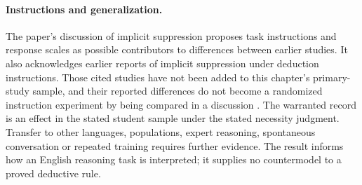 \paragraph{Instructions and generalization.}
The paper's discussion of implicit suppression proposes task instructions and
response scales as possible contributors to differences between earlier
studies. It also acknowledges earlier reports of implicit suppression under
deduction instructions. Those cited studies have not been added to this
chapter's primary-study sample, and their reported differences do not become
a randomized instruction experiment by being compared in a discussion
\cite[Sec.~6.1.5]{CarianiRips2017Suppression}.
The warranted record is an effect in the stated student sample under the
stated necessity judgment. Transfer to other languages, populations, expert
reasoning, spontaneous conversation or repeated training requires further
evidence. The result informs how an English reasoning task is interpreted;
it supplies no countermodel to a proved deductive rule.
